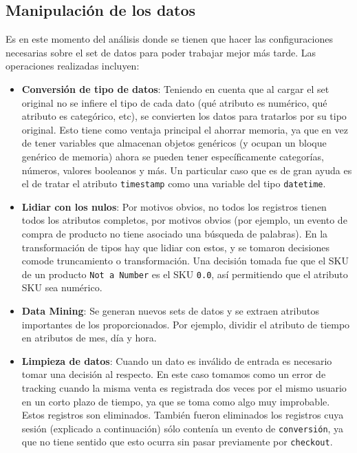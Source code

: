 \documentclass[a4paper]{article}
\begin{document}
\subsection{Manipulación de los datos}

Es en este momento del análisis donde se tienen que hacer las configuraciones necesarias sobre el set de datos para poder trabajar mejor más tarde. Las operaciones realizadas incluyen:

\begin{itemize}
\item \textbf{Conversión de tipo de datos}: Teniendo en cuenta que al cargar el set original no se infiere el tipo de cada dato (qué atributo es numérico, qué atributo es categórico, etc), se convierten los datos para tratarlos por su tipo original. Esto tiene como ventaja principal el ahorrar memoria, ya que en vez de tener variables que almacenan objetos genéricos (y ocupan un bloque genérico de memoria) ahora se pueden tener específicamente categorías, números, valores booleanos y más. Un particular caso que es de gran ayuda es el de tratar el atributo \texttt{timestamp} como una variable del tipo \texttt{datetime}. 
\item \textbf{Lidiar con los nulos}: Por motivos obvios, no todos los registros tienen todos los atributos completos, por motivos obvios (por ejemplo, un evento de compra de producto no tiene asociado una búsqueda de palabras). En la transformación de tipos hay que lidiar con estos, y se tomaron decisiones comode truncamiento o transformación. Una decisión tomada fue que el SKU de un producto \texttt{Not a Number} es el SKU \texttt{0.0}, así permitiendo que el atributo SKU sea numérico.
\item \textbf{Data Mining}: Se generan nuevos sets de datos y se extraen atributos importantes de los proporcionados. Por ejemplo, dividir el atributo de tiempo en atributos de mes, día y hora.
\item \textbf{Limpieza de datos}: Cuando un dato es inválido de entrada es necesario tomar una decisión al respecto. En este caso tomamos como un error de tracking cuando la misma venta es registrada dos veces por el mismo usuario en un corto plazo de tiempo, ya que se toma como algo muy improbable. Estos registros son eliminados. También fueron eliminados los registros cuya sesión (explicado a continuación) sólo contenía un evento de \texttt{conversión}, ya que no tiene sentido que esto ocurra sin pasar previamente por \texttt{checkout}.
\end{itemize}
\end{document}
